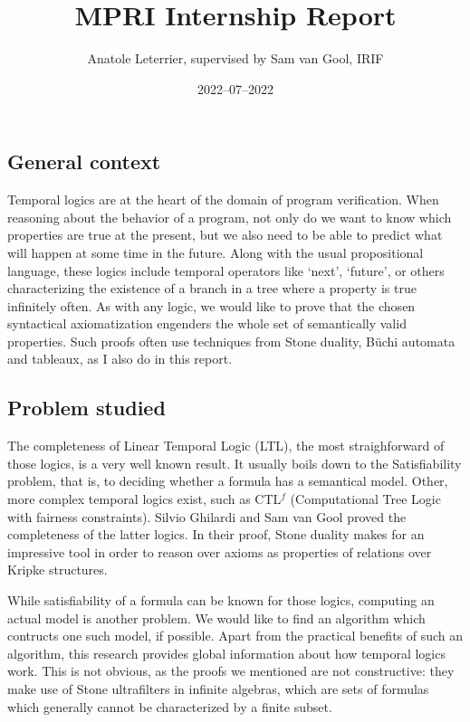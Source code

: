 \documentclass[11pt]{article}
\title{MPRI Internship Report}
\author{Anatole Leterrier, supervised by Sam van Gool, IRIF}
\date{2022--07--2022}
\newcommand{\CTLf}{{CTL$^f$ }}
\begin{document}
\maketitle

\section*{}

\subsection*{General context}
Temporal logics are at the heart of the domain of program verification.
When reasoning about the behavior of a program, not only do we want 
to know which properties are true at the present, but we also need 
to be able to predict what will happen at some time in the future.
Along with the usual propositional language, these logics include
temporal operators like `next', `future', or others characterizing
the existence of a branch in a tree where a property is true
infinitely often.
As  with any logic, we would like to prove that the chosen syntactical
axiomatization engenders the whole set of semantically valid properties.
Such proofs often use techniques from Stone duality, Büchi automata and
tableaux, as I also do in this report.

\subsection*{Problem studied}
The completeness of Linear Temporal Logic (LTL), the most straighforward
of those logics, is a very well known result. It usually boils down
to the Satisfiability problem, that is, to deciding whether a formula
has a semantical model. Other, more complex temporal logics exist, such 
as \CTLf(Computational Tree Logic with fairness constraints). Silvio
Ghilardi and Sam van Gool proved the completeness of the latter logics.
In their proof, Stone duality makes for an impressive tool in order to
reason over axioms as properties of relations over Kripke structures. 

While satisfiability of a formula can be known for those logics, computing
an actual model is another problem. We would like to find an algorithm
which contructs one such model, if possible. Apart from the practical
benefits of such an algorithm, this research provides global information 
about how temporal logics work. This is not obvious, as
the proofs we mentioned are not constructive: they make use of Stone 
ultrafilters in infinite algebras, which are sets of formulas which 
generally cannot be characterized by a finite subset.
\end{document}
